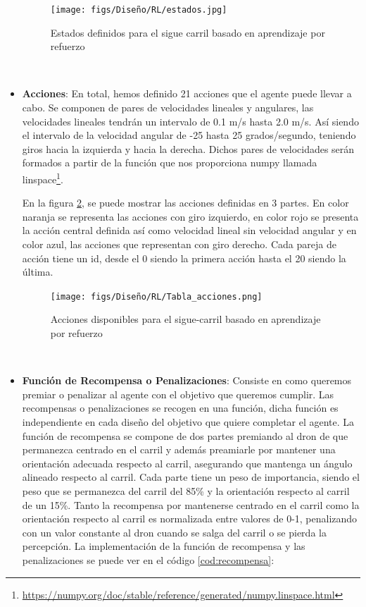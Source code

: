 \begin{itemize}
    \begin{figure} [H]
      \begin{center}
        \texttt{[image: figs/Diseño/RL/estados.jpg]}
      \end{center}
      \caption{Estados definidos para el sigue carril basado en aprendizaje por refuerzo}
      \label{fig:Estados}
    \end{figure}\

    \item \textbf{Acciones}: En total, hemos definido 21 acciones que el agente puede llevar a cabo. Se componen de pares de velocidades lineales y angulares, las velocidades lineales
    tendrán un intervalo de 0.1 m/s hasta 2.0 m/s. Así siendo el intervalo de la velocidad angular de -25 hasta 25 grados/segundo, teniendo giros hacia la izquierda y hacia la derecha. Dichos pares
    de velocidades serán formados a partir de la función que nos proporciona numpy llamada linspace\footnote{\url{https://numpy.org/doc/stable/reference/generated/numpy.linspace.html}}. \newline

    En la figura \ref{fig:Acciones}, se puede mostrar las acciones definidas en 3 partes. En color naranja se representa las acciones con giro izquierdo, en color rojo se presenta 
    la acción central definida así como velocidad lineal sin velocidad angular y en color azul, las acciones que representan con giro derecho. Cada pareja de acción tiene un id, desde el 0
    siendo la primera acción hasta el 20 siendo la última.
  
    \begin{figure} [H]
      \begin{center}
        \texttt{[image: figs/Diseño/RL/Tabla\_acciones.png]}
      \end{center}
      \caption{Acciones disponibles para el sigue-carril basado en aprendizaje por refuerzo}
      \label{fig:Acciones}
    \end{figure}\
  
    \item \textbf{Función de Recompensa o Penalizaciones}: Consiste en como queremos premiar o penalizar al agente con el objetivo que queremos cumplir. Las recompensas o penalizaciones se recogen
    en una función, dicha función es independiente en cada diseño del objetivo que quiere completar el agente. La función de recompensa se compone de dos partes premiando al dron de que
    permanezca centrado en el carril y además preamiarle por mantener una orientación adecuada respecto al carril, asegurando que mantenga un ángulo alineado respecto al carril. Cada parte tiene un peso
    de importancia, siendo el peso que se permanezca del carril del 85\% y la orientación respecto al carril de un 15\%. Tanto la recompensa por mantenerse centrado en el carril 
    como la orientación respecto al carril es normalizada entre valores de 0-1, penalizando con un valor constante al dron cuando se salga del carril o 
    se pierda la percepción. La implementación de la función de recompensa y las penalizaciones se puede ver en el código \ref{cod:recompensa}:


\end{itemize}
